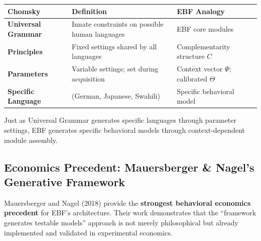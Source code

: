 \begin{center}
\renewcommand{\arraystretch}{1.4}
\begin{tabular}{@{}p{4.5cm}p{4.5cm}p{4cm}@{}}
\toprule
\textbf{Chomsky} & \textbf{Definition} & \textbf{EBF Analogy} \\
\midrule
\textbf{Universal Grammar} & Innate constraints on possible human languages &
    EBF core modules \\
\textbf{Principles} & Fixed settings shared by all languages &
    Complementarity structure $C$ \\
\textbf{Parameters} & Variable settings; set during acquisition &
    Context vector $\Psi$; calibrated $\Theta$ \\
\textbf{Specific Language} & (German, Japanese, Swahili) &
    Specific behavioral model \\
\bottomrule
\end{tabular}
\end{center}

Just as Universal Grammar generates specific languages through parameter settings,
EBF generates specific behavioral models through context-dependent module assembly.

\subsection{Economics Precedent: Mauersberger \& Nagel's Generative Framework}

Mauersberger and Nagel (2018) provide the \textbf{strongest behavioral economics precedent}
for EBF's architecture. Their work demonstrates that the ``framework generates testable models''
approach is not merely philosophical but already implemented and validated in experimental economics.

